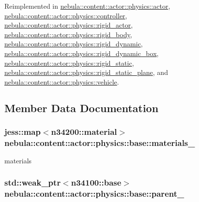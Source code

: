 Reimplemented in \hyperlink{classnebula_1_1content_1_1actor_1_1physics_1_1actor_a7b7a1ee3673ad9f618a20e327e1a974c}{nebula::content::actor::physics::actor}, \hyperlink{classnebula_1_1content_1_1actor_1_1physics_1_1controller_abda74fc66665e489ae6364efd1eb7e30}{nebula::content::actor::physics::controller}, \hyperlink{classnebula_1_1content_1_1actor_1_1physics_1_1rigid__actor_a9227091110aae435ca13493edd27fe66}{nebula::content::actor::physics::rigid\_\-actor}, \hyperlink{classnebula_1_1content_1_1actor_1_1physics_1_1rigid__body_a7c8c0d4a581a36f3015912d1d73166f6}{nebula::content::actor::physics::rigid\_\-body}, \hyperlink{classnebula_1_1content_1_1actor_1_1physics_1_1rigid__dynamic_a37baf9ed4986782294789073ebb05f19}{nebula::content::actor::physics::rigid\_\-dynamic}, \hyperlink{classnebula_1_1content_1_1actor_1_1physics_1_1rigid__dynamic__box_ac3f90a5c975d090930fb77f5961e7064}{nebula::content::actor::physics::rigid\_\-dynamic\_\-box}, \hyperlink{classnebula_1_1content_1_1actor_1_1physics_1_1rigid__static_a8ecc4b9b308562ab3942bdac5b8ddfea}{nebula::content::actor::physics::rigid\_\-static}, \hyperlink{classnebula_1_1content_1_1actor_1_1physics_1_1rigid__static__plane_ab42f682ba60457dc596613690b57517e}{nebula::content::actor::physics::rigid\_\-static\_\-plane}, and \hyperlink{classnebula_1_1content_1_1actor_1_1physics_1_1vehicle_aefc63005bb3cd58e94f86b33ca07e17c}{nebula::content::actor::physics::vehicle}.

\subsection{Member Data Documentation}
\hypertarget{classnebula_1_1content_1_1actor_1_1physics_1_1base_a6ccde21685a79a1b9e699a2055b725f6}{
\subsubsection[{materials\_\-}]{\setlength{\rightskip}{0pt plus 5cm}jess::map$<${\bf n34200::material}$>$ {\bf nebula::content::actor::physics::base::materials\_\-}}}
\label{classnebula_1_1content_1_1actor_1_1physics_1_1base_a6ccde21685a79a1b9e699a2055b725f6}


materials \hypertarget{classnebula_1_1content_1_1actor_1_1physics_1_1base_a225162a653eae9e2821d9c36de7f86a7}{
\subsubsection[{parent\_\-}]{\setlength{\rightskip}{0pt plus 5cm}std::weak\_\-ptr$<${\bf n34100::base}$>$ {\bf nebula::content::actor::physics::base::parent\_\-}}}
\label{classnebula_1_1content_1_1actor_1_1physics_1_1base_a225162a653eae9e2821d9c36de7f86a7}


